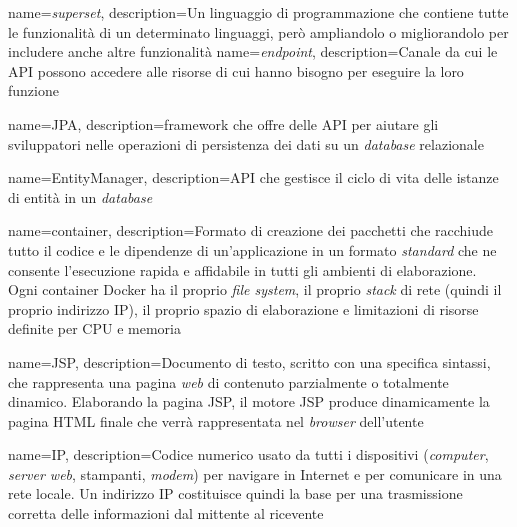 



{
    name=\textit{superset},
    description={Un linguaggio di programmazione che contiene tutte le funzionalità di un determinato linguaggi, però ampliandolo o migliorandolo per includere anche altre funzionalità}
}
{
    name=\textit{endpoint},
    description={Canale da cui le \gls{API} possono accedere alle risorse di cui hanno bisogno per eseguire la loro funzione}
}

{
    name=JPA,
    description={\Gls{framework} che offre delle \gls{API} per aiutare gli sviluppatori nelle operazioni di persistenza dei dati su un \textit{database} relazionale}
}


{
    name=EntityManager,
    description={API che gestisce il ciclo di vita delle istanze di entità in un \textit{database}}
}

{
    name=container,
    description={Formato di creazione dei pacchetti che racchiude tutto il codice e le dipendenze di un'applicazione in un formato \textit{standard} che ne consente l'esecuzione rapida e affidabile in tutti gli ambienti di elaborazione.\\ Ogni container Docker ha il proprio \textit{file system}, il proprio \textit{stack} di rete (quindi il proprio indirizzo \gls{IP}), il proprio spazio di elaborazione e limitazioni di risorse definite per CPU e memoria}
}

{
    name=JSP,
    description={Documento di testo, scritto con una specifica sintassi, che rappresenta una pagina \textit{web} di contenuto parzialmente o totalmente dinamico. Elaborando la pagina JSP, il motore JSP produce dinamicamente la pagina HTML finale che verrà rappresentata nel \textit{browser} dell'utente}
}

{
    name=IP,
    description={Codice numerico usato da tutti i dispositivi (\textit{computer}, \textit{server web}, stampanti, \textit{modem}) per navigare in Internet e per comunicare in una rete locale. Un indirizzo IP costituisce quindi la base per una trasmissione corretta delle informazioni dal mittente al ricevente}
}

